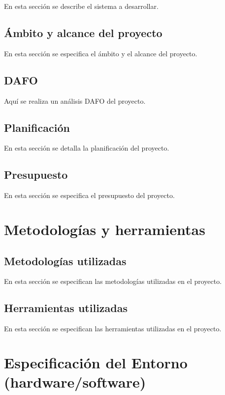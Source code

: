 En esta sección se describe el sistema a desarrollar.

\subsection{\textbf{Ámbito y alcance del proyecto}}

En esta sección se especifica el ámbito y el alcance del proyecto.

\subsection{\textbf{DAFO}}

Aquí se realiza un análisis DAFO del proyecto.

\subsection{\textbf{Planificación}}

En esta sección se detalla la planificación del proyecto.

\subsection{\textbf{Presupuesto}}

En esta sección se especifica el presupuesto del proyecto.

\section{\textbf{Metodologías y herramientas}}

\subsection{\textbf{Metodologías utilizadas}}

En esta sección se especifican las metodologías utilizadas en el proyecto.

\subsection{\textbf{Herramientas utilizadas}}

En esta sección se especifican las herramientas utilizadas en el proyecto.

\section{\textbf{Especificación del Entorno (hardware/software)}}

